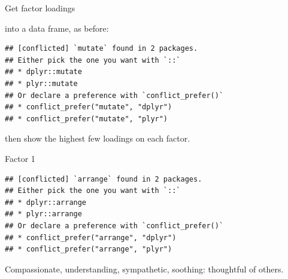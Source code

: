 \documentclass[ignorenonframetext,]{beamer}
\newenvironment{Shaded}{\begin{snugshade}}{\end{snugshade}}
\newcommand{\DataTypeTok}[1]{\textcolor[rgb]{0.13,0.29,0.53}{#1}}
\newcommand{\DecValTok}[1]{\textcolor[rgb]{0.00,0.00,0.81}{#1}}
\newcommand{\FloatTok}[1]{\textcolor[rgb]{0.00,0.00,0.81}{#1}}
\newcommand{\KeywordTok}[1]{\textcolor[rgb]{0.13,0.29,0.53}{\textbf{#1}}}
\newcommand{\NormalTok}[1]{#1}
\newcommand{\OperatorTok}[1]{\textcolor[rgb]{0.81,0.36,0.00}{\textbf{#1}}}
\newcommand{\StringTok}[1]{\textcolor[rgb]{0.31,0.60,0.02}{#1}}
\begin{document}
\begin{frame}[fragile]{Get factor loadings}
\protect\hypertarget{get-factor-loadings}{}

into a data frame, as before:

\begin{Shaded}
\end{Shaded}

\begin{verbatim}
## [conflicted] `mutate` found in 2 packages.
## Either pick the one you want with `::` 
## * dplyr::mutate
## * plyr::mutate
## Or declare a preference with `conflict_prefer()`
## * conflict_prefer("mutate", "dplyr")
## * conflict_prefer("mutate", "plyr")
\end{verbatim}

then show the highest few loadings on each factor.

\end{frame}

\begin{frame}[fragile]{Factor 1}
\protect\hypertarget{factor-1}{}

\begin{Shaded}
\end{Shaded}

\begin{verbatim}
## [conflicted] `arrange` found in 2 packages.
## Either pick the one you want with `::` 
## * dplyr::arrange
## * plyr::arrange
## Or declare a preference with `conflict_prefer()`
## * conflict_prefer("arrange", "dplyr")
## * conflict_prefer("arrange", "plyr")
\end{verbatim}

Compassionate, understanding, sympathetic, soothing: thoughtful of
others.

\end{frame}
\end{document}
